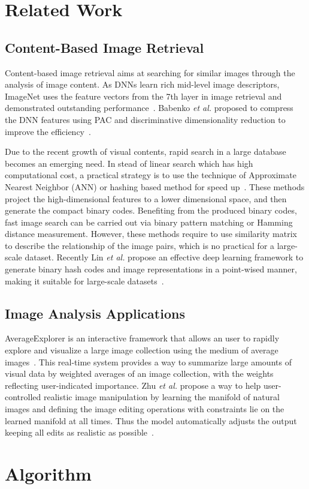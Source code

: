 \section{Related Work}
\subsection{Content-Based Image Retrieval}
Content-based image retrieval aims at searching for similar images
through the analysis of image content. As DNNs learn rich mid-level
image descriptors, ImageNet uses the feature vectors from the 7th
layer in image retrieval and demonstrated outstanding
performance~\cite{krizhevsky2012imagenet}. Babenko \textit{et al.}
proposed to compress the DNN features using PAC and discriminative
dimensionality reduction to improve the efficiency~\cite{babenko2014neural}.

Due to the recent growth of visual contents, rapid search in a large
database becomes an emerging need. In stead of linear search which has
high computational cost, a practical strategy is to use the technique
of Approximate Nearest Neighbor (ANN) or hashing based method for
speed up~\cite{gionis1999similarity,weiss2009spectral,kulis2009learning,
norouzi2011minimal,liu2012supervised,xia2014supervised}. These methods
project the high-dimensional features to a lower dimensional space, and
then generate the compact binary codes. Benefiting from the produced
binary codes, fast image search can be carried out via binary pattern
matching or Hamming distance measurement. However, these methods require
to use similarity matrix to describe the relationship of the image pairs, which
is no practical for a large-scale dataset. Recently Lin \textit{et al.}
propose an effective deep learning framework to generate binary hash codes
and image representations in a point-wised manner, making it suitable
for large-scale datasets~\cite{lin2015deep}.

\subsection{Image Analysis Applications}
AverageExplorer is an interactive framework that allows an user to rapidly
explore and visualize a large image collection using the medium of average
images~\cite{zhu2014averageexplorer}. This real-time system provides a
way to summarize large amounts of visual data by weighted averages of
an image collection, with the weights reflecting user-indicated importance.
Zhu \textit{et al.} propose a way to help user-controlled realistic image
manipulation by learning the manifold of natural images and defining the
image editing operations with constraints lie on the learned manifold at
all times. Thus the model automatically adjusts the output keeping all edits
as realistic as possible~\cite{zhu2016generative}.

\section{Algorithm}